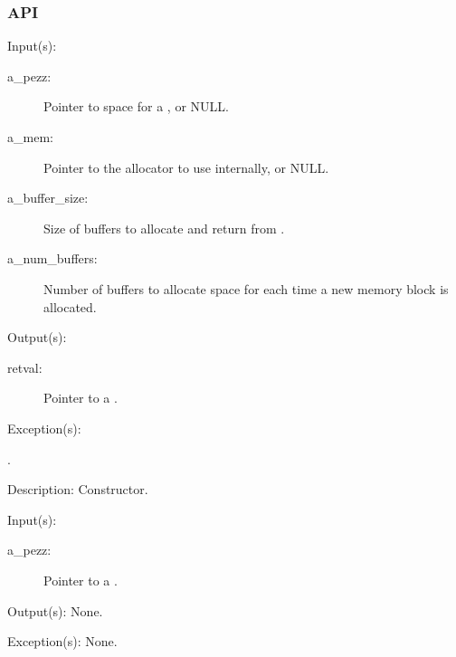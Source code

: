 \subsubsection{API}
\begin{capi}
\label{pezz_new}
	\begin{capilist}
	\item[Input(s): ]
		\begin{description}\item[]
		\item[a\_pezz: ]
			Pointer to space for a , or NULL.
		\item[a\_mem: ]
			Pointer to the allocator to use internally, or NULL.
		\item[a\_buffer\_size: ]
			Size of buffers to allocate and return from
			.
		\item[a\_num\_buffers: ]
			Number of buffers to allocate space for each time a new
			memory block is allocated.
		\end{description}
	\item[Output(s): ]
		\begin{description}\item[]
		\item[retval: ]
			Pointer to a .
		\end{description}
	\item[Exception(s): ]
		\begin{description}\item[]
		\item[.]
		\end{description}
	\item[Description: ]
		Constructor.
	\end{capilist}
\label{pezz_delete}
	\begin{capilist}
	\item[Input(s): ]
		\begin{description}\item[]
		\item[a\_pezz: ]
			Pointer to a \classname{pezz}.
		\end{description}
	\item[Output(s): ] None.
	\item[Exception(s): ] None.

\end{capilist}
\end{capi}
